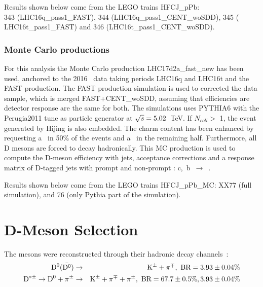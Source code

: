 Results shown below come from the LEGO trains HFCJ\_pPb: \\343 (LHC16q\_pass1\_FAST), 344 (LHC16q\_pass1\_CENT\_woSDD), 345 ( LHC16t\_pass1\_FAST) and 346 (LHC16t\_pass1\_CENT\_woSDD).
\subsubsection{Monte Carlo productions}

For this analysis the Monte Carlo production LHC17d2a\_fast\_new has been used, anchored to the 2016 \pPb\ data taking periods LHC16q and LHC16t and the FAST production. The FAST production simulation is used to corrected the data sample, which is merged FAST+CENT\_woSDD, assuming that efficiencies are detector response are the same for both.
The simulations uses PYTHIA6 with the Perugia2011 tune as particle generator at $\sqrt{s}=5.02$~TeV. If $N_{coll} > $ 1, the event generated by Hijing is also embedded.
The charm content has been enhanced by requesting a \ccbar\ in 50\% of the events and a \bbbar\ in the remaining half.
Furthermore, all D mesons are forced to decay hadronically.
This MC production is used to compute the D-meson efficiency with jets, acceptance corrections and a response matrix of D-tagged jets with prompt and non-prompt \Dstar: c,~b~$\rightarrow$~\Dstar.

Results shown below come from the LEGO trains HFCJ\_pPb\_MC: {\color{red} XX}77 (full simulation), and 76 (only Pythia part of the simulation).



\section{D-Meson Selection}
\label{sec:DmesonSel}
The \Dstar mesons were reconstructed through their hadronic decay channels~\cite{PDG:2016}:
\begin{eqnarray*}
\mathrm{D^{0}} (\bar{\mathrm{D^{0}}}) &\to& {\rm K}^{\pm} + \pi^{\mp}  , {\text{ BR}} = 3.93\pm0.04\%\\
\mathrm{D^{*\pm}} \to \mathrm{D^{0}} + \pi^{\pm} &\to& {\rm K}^{\pm} + \pi^{\mp}  + \pi^{\pm} , {\text{ BR}} = 67.7\pm0.5\%, 3.93\pm0.04\%
\end{eqnarray*}

